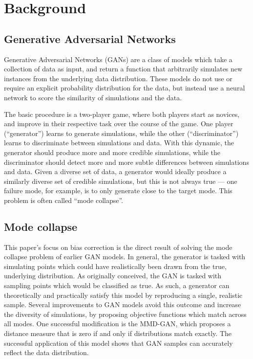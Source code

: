 \section{Background}

\subsection{Generative Adversarial Networks}
Generative Adversarial Networks (GANs) are a class of models which take a collection of data as input, and return a function that arbitrarily simulates new instances from the underlying data distribution. These models do not use or require an explicit probability distribution for the data, but instead use a neural network to score the similarity of simulations and the data.

The basic procedure is a two-player game, where both players start as novices, and improve in their respective task over the course of the game. One player (``generator'') learns to  generate simulations, while the other (``discriminator'') learns to discriminate between simulations and data. With this dynamic, the generator should produce more and more credible simulations, while the discriminator should detect more and more subtle differences between simulations and data. Given a diverse set of data, a generator would ideally produce a similarly diverse set of credible simulations, but this is not always true --- one failure mode, for example, is to only generate close to the target mode. This problem is often called ``mode collapse''.

\subsection{Mode collapse}
This paper's focus on bias correction is the direct result of solving the mode collapse problem of earlier GAN models. In general, the generator is tasked with simulating points which could have realistically been drawn from the true, underlying distribution. As originally conceived, the GAN is tasked with sampling points which would be classified as true. As such, a generator can theoretically and practically satisfy this model by reproducing a single, realistic sample. Several improvements to GAN models avoid this outcome and increase the diversity of simulations, by proposing objective functions which match across all modes. One successful modification is the MMD-GAN, which proposes a distance measure that is zero if and only if distributions match exactly. The successful application of this model shows that GAN samples can accurately reflect the data distribution.

